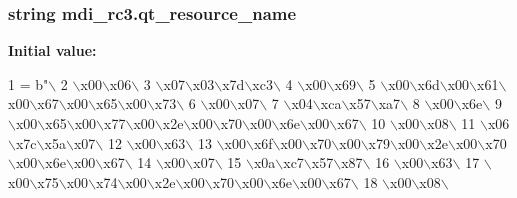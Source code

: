 \subsubsection[{qt\+\_\+resource\+\_\+name}]{\setlength{\rightskip}{0pt plus 5cm}string mdi\+\_\+rc3.\+qt\+\_\+resource\+\_\+name}\label{namespacemdi__rc3_af4e53d8670db434136fc12eacd272326}
{\bfseries Initial value\+:}
\begin{DoxyCode}
1 = b\textcolor{stringliteral}{"\(\backslash\)}
2 \textcolor{stringliteral}{\(\backslash\)x00\(\backslash\)x06\(\backslash\)}
3 \textcolor{stringliteral}{\(\backslash\)x07\(\backslash\)x03\(\backslash\)x7d\(\backslash\)xc3\(\backslash\)}
4 \textcolor{stringliteral}{\(\backslash\)x00\(\backslash\)x69\(\backslash\)}
5 \textcolor{stringliteral}{\(\backslash\)x00\(\backslash\)x6d\(\backslash\)x00\(\backslash\)x61\(\backslash\)x00\(\backslash\)x67\(\backslash\)x00\(\backslash\)x65\(\backslash\)x00\(\backslash\)x73\(\backslash\)}
6 \textcolor{stringliteral}{\(\backslash\)x00\(\backslash\)x07\(\backslash\)}
7 \textcolor{stringliteral}{\(\backslash\)x04\(\backslash\)xca\(\backslash\)x57\(\backslash\)xa7\(\backslash\)}
8 \textcolor{stringliteral}{\(\backslash\)x00\(\backslash\)x6e\(\backslash\)}
9 \textcolor{stringliteral}{\(\backslash\)x00\(\backslash\)x65\(\backslash\)x00\(\backslash\)x77\(\backslash\)x00\(\backslash\)x2e\(\backslash\)x00\(\backslash\)x70\(\backslash\)x00\(\backslash\)x6e\(\backslash\)x00\(\backslash\)x67\(\backslash\)}
10 \textcolor{stringliteral}{\(\backslash\)x00\(\backslash\)x08\(\backslash\)}
11 \textcolor{stringliteral}{\(\backslash\)x06\(\backslash\)x7c\(\backslash\)x5a\(\backslash\)x07\(\backslash\)}
12 \textcolor{stringliteral}{\(\backslash\)x00\(\backslash\)x63\(\backslash\)}
13 \textcolor{stringliteral}{\(\backslash\)x00\(\backslash\)x6f\(\backslash\)x00\(\backslash\)x70\(\backslash\)x00\(\backslash\)x79\(\backslash\)x00\(\backslash\)x2e\(\backslash\)x00\(\backslash\)x70\(\backslash\)x00\(\backslash\)x6e\(\backslash\)x00\(\backslash\)x67\(\backslash\)}
14 \textcolor{stringliteral}{\(\backslash\)x00\(\backslash\)x07\(\backslash\)}
15 \textcolor{stringliteral}{\(\backslash\)x0a\(\backslash\)xc7\(\backslash\)x57\(\backslash\)x87\(\backslash\)}
16 \textcolor{stringliteral}{\(\backslash\)x00\(\backslash\)x63\(\backslash\)}
17 \textcolor{stringliteral}{\(\backslash\)x00\(\backslash\)x75\(\backslash\)x00\(\backslash\)x74\(\backslash\)x00\(\backslash\)x2e\(\backslash\)x00\(\backslash\)x70\(\backslash\)x00\(\backslash\)x6e\(\backslash\)x00\(\backslash\)x67\(\backslash\)}
18 \textcolor{stringliteral}{\(\backslash\)x00\(\backslash\)x08\(\backslash\)}

\end{DoxyCode}
